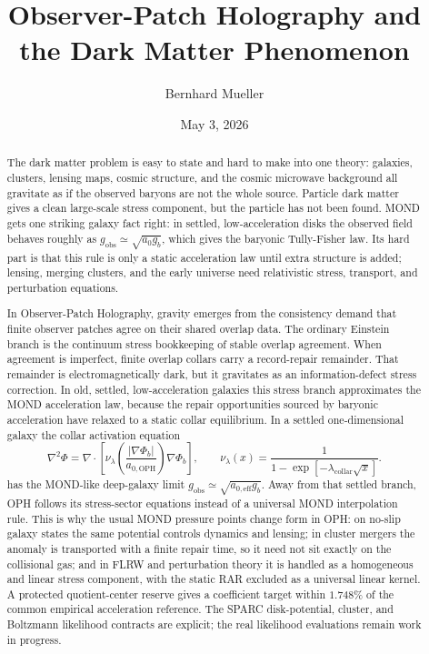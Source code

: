 \documentclass[11pt]{article}
\title{Observer-Patch Holography and the Dark Matter Phenomenon}
\author{Bernhard Mueller}
\date{May 3, 2026}
\begin{document}
\maketitle

\begin{abstract}
The dark matter problem is easy to state and hard to make into one theory:
galaxies, clusters, lensing maps, cosmic structure, and the cosmic microwave
background all gravitate as if the observed baryons are not the whole source.
Particle dark matter gives a clean large-scale stress component, but the
particle has not been found.  MOND gets one striking galaxy fact right: in
settled, low-acceleration disks the observed field behaves roughly as
\(g_{\mathrm{obs}}\simeq\sqrt{a_0 g_b}\), which gives the baryonic
Tully-Fisher law.  Its hard part is that this rule is only a static
acceleration law until extra structure is added; lensing, merging clusters, and
the early universe need relativistic stress, transport, and perturbation
equations.

In Observer-Patch Holography, gravity emerges from the consistency demand that
finite observer patches agree on their shared overlap data.  The ordinary
Einstein branch is the continuum stress bookkeeping of stable overlap
agreement.  When agreement is imperfect, finite overlap collars carry a
record-repair remainder.  That remainder is electromagnetically dark, but it
gravitates as an information-defect stress correction.  In old, settled,
low-acceleration galaxies this stress branch approximates the MOND
acceleration law, because the repair opportunities sourced by baryonic
acceleration have relaxed to a static collar equilibrium.  In a settled
one-dimensional galaxy the collar activation equation
\[
\nabla^2\Phi
 =
 \nabla\cdot
 \left[
   \nu_\lambda\!\left(\frac{|\nabla\Phi_b|}{a_{0,\mathrm{OPH}}}\right)
   \nabla\Phi_b
 \right],
 \qquad
 \nu_\lambda(x)=
 \frac{1}{1-\exp[-\lambda_{\mathrm{collar}}\sqrt{x}]} .
\]
has the MOND-like deep-galaxy limit
\(g_{\mathrm{obs}}\simeq\sqrt{a_{0,\mathrm{eff}}g_b}\).  Away from that
settled branch, OPH follows its stress-sector equations instead of a universal
MOND interpolation rule.  This is why the usual MOND pressure points change
form in OPH: on no-slip galaxy states the same potential controls
dynamics and lensing; in cluster mergers the anomaly is transported with a
finite repair time, so it need not sit exactly on the collisional gas; and in
FLRW and perturbation theory it is handled as a homogeneous and linear stress
component, with the static RAR excluded as a universal linear kernel.  A protected
quotient-center reserve gives a coefficient target within \(1.748\%\) of the
common empirical acceleration reference.  The SPARC disk-potential, cluster,
and Boltzmann likelihood
contracts are explicit; the real likelihood evaluations remain work in
progress.
\end{abstract}
\end{document}
